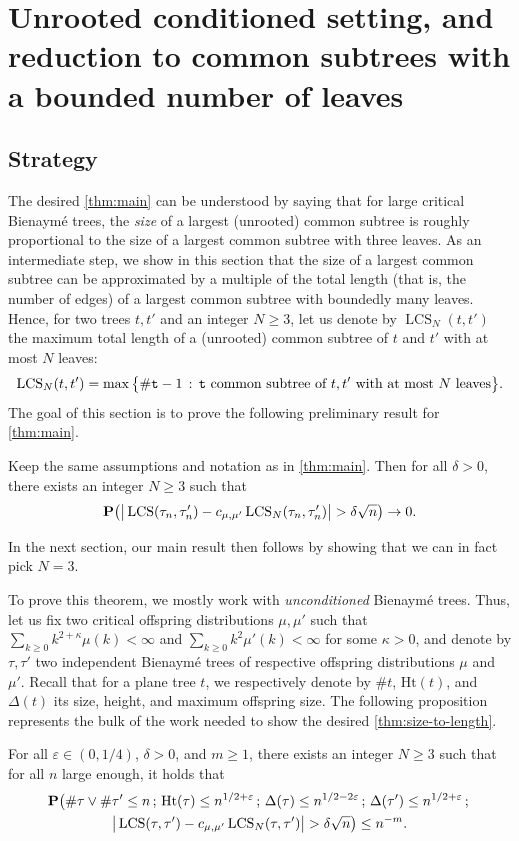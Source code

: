 \documentclass[11pt,reqno]{amsart}
\newcommand{\Ht}{\mathrm{Ht}}
\newcommand{\LCS}{\operatorname{LCS}}
\begin{document}
\section{Unrooted conditioned setting, and reduction to common subtrees with a bounded number of leaves}\label{sec:Unrooted_LCS}

\subsection{Strategy}
The desired \cref{thm:main} can be understood by saying that for large critical Bienaymé trees, the \emph{size} of a largest (unrooted) common subtree is roughly proportional to the size of a largest common subtree with three leaves. As an intermediate step, we show in this section that the size of a largest common subtree can be approximated by a multiple of the total length (that is, the number of edges) of a largest common subtree with boundedly many leaves. Hence, for two trees $t,t'$ and an integer $N\geq 3$, let us denote by $\LCS_N(t,t')$ the maximum total length of a (unrooted) common subtree of $t$ and $t'$ with at most $N$ leaves: 
\begin{equation}
\label{expr_dscr_LCS_N}
\LCS_N(t,t')=\max\big\{\#\ttt -1 \, :\, \ttt \text{ common subtree of $t,t'$ with at most $N$ leaves} \big\}.
\end{equation}
The goal of this section is to prove the following preliminary result for \cref{thm:main}.
\begin{thm}
\label{thm:size-to-length}
Keep the same assumptions and notation as in \cref{thm:main}. Then for all $\delta>0$, there exists an integer $N\geq 3$ such that
\[\P\big(\big|\LCS(\tau_n,\tau_n')-c_{\mu,\mu'}\LCS_N(\tau_n,\tau_n')\big|>\delta\sqrt{n}\big)\to 0.\]
\end{thm}
In the next section, our main result then follows by showing that we can in fact pick $N=3$.

To prove this theorem, we mostly work with \emph{unconditioned} Bienaymé trees. Thus, let us fix two critical offspring distributions $\mu,\mu'$ such that $\sum_{k\geq 0}k^{2+\kappa}\mu(k)<\infty$ and $\sum_{k\geq 0}k^2\mu'(k)<\infty$ for some $\kappa>0$, and denote by $\tau,\tau'$ two independent Bienaymé trees of respective offspring distributions $\mu$ and $\mu'$. Recall that for a plane tree $t$, we respectively denote by $\#t$, $\Ht(t)$, and $\Delta(t)$ its size, height, and maximum offspring size. The following proposition represents the bulk of the work needed to show the desired \cref{thm:size-to-length}.
\begin{prop}
\label{prop:size-to-length_estimate}
For all $\varepsilon\in (0,1/4)$, $\delta>0$, and $m\geq 1$, there exists an integer $N\geq 3$ such that for all $n$ large enough, it holds that
\begin{multline*}
\P\big(\#\tau\vee\#\tau'\leq n\, ;\, \Ht(\tau)\leq n^{1/2+\varepsilon} \, ;\, \Delta(\tau)\leq n^{1/2-2\varepsilon}\, ;\, \Delta(\tau')\leq n^{1/2+\varepsilon}\, ;\,\\
\big|\LCS(\tau,\tau')-c_{\mu,\mu'}\LCS_N(\tau,\tau')\big|>\delta\sqrt{n}\big)\leq n^{-m}.
\end{multline*}
\end{prop}
\end{document}
